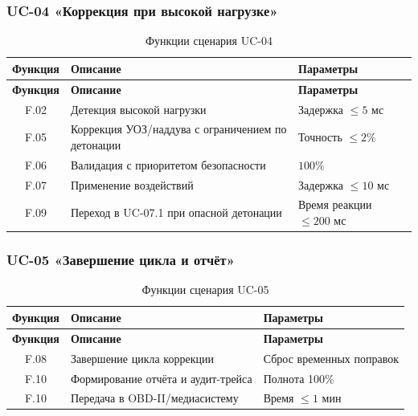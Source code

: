 \documentclass[14pt, a4paper]{extarticle}
\begin{document}
					\subsubsection{UC-04 «Коррекция при высокой нагрузке»}
					
					\begin{xltabular}{\textwidth}{|c|L|L|}
						\caption{Функции сценария UC-04}\label{tab:func-uc04}\\
						\hline
						\textbf{Функция} & \textbf{Описание} & \textbf{Параметры} \\
						\hline
						\endfirsthead
						\hline
						\textbf{Функция} & \textbf{Описание} & \textbf{Параметры} \\
						\hline
						\endhead
						\hline
						\endfoot
						\hline
						\endlastfoot
						F.02 & Детекция высокой нагрузки & Задержка \(\leq 5\) мс \\
						\hline
						F.05 & Коррекция УОЗ/наддува с ограничением по детонации & Точность \(\leq 2\%\) \\
						\hline
						F.06 & Валидация с приоритетом безопасности & \(100\%\) \\
						\hline
						F.07 & Применение воздействий & Задержка \(\leq 10\) мс \\
						\hline
						F.09 & Переход в UC-07.1 при опасной детонации & Время реакции \(\leq 200\) мс \\
						\hline
					\end{xltabular}
					
					\subsubsection{UC-05 «Завершение цикла и отчёт»}
					
					\begin{xltabular}{\textwidth}{|c|L|L|}
						\caption{Функции сценария UC-05}\label{tab:func-uc05}\\
						\hline
						\textbf{Функция} & \textbf{Описание} & \textbf{Параметры} \\
						\hline
						\endfirsthead
						\hline
						\textbf{Функция} & \textbf{Описание} & \textbf{Параметры} \\
						\hline
						\endhead
						\hline
						\endfoot
						\hline
						\endlastfoot
						F.08 & Завершение цикла коррекции & Сброс временных поправок \\
						\hline
						F.10 & Формирование отчёта и аудит-трейса & Полнота 100\% \\
						\hline
						F.10 & Передача в OBD-II/медиасистему & Время \(\leq 1\) мин \\
						\hline
					\end{xltabular}
					
\end{document}
